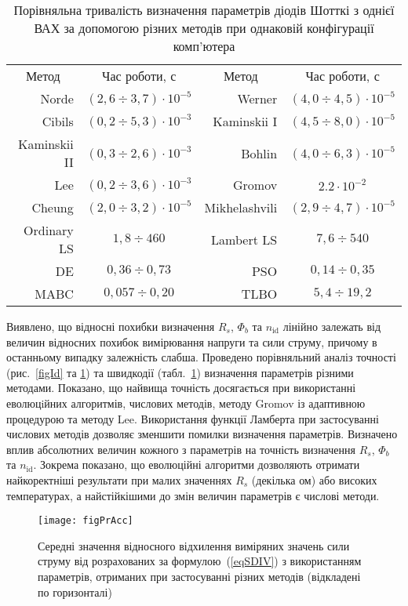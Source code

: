 \begin{table}
\caption{\label{tabRT}Порівняльна тривалість визначення параметрів діодів Шотткі з однієї ВАХ за допомогою різних методів при однаковій конфігурації комп'ютера}
\centering
\begin{tabular}{|r|c|r|c|}
\hline
\multicolumn{1}{|c|}{Метод}&Час роботи, с &\multicolumn{1}{c|}{Метод}&Час роботи, с\\ \hhline{|====|}
Norde &$(2,6\div3,7)\cdot10^{-5}$& Werner  &$(4,0\div4,5)\cdot10^{-5}$\\ \hline
Cibils  &$(0,2\div5,3)\cdot10^{-3}$& Kaminskii I &$(4,5\div8,0)\cdot10^{-5}$\\ \hline
Kaminskii II &$(0,3\div2,6)\cdot10^{-3}$& Bohlin &$(4,0\div6,3)\cdot10^{-5}$\\ \hline
Lee &$(0,2\div3,6)\cdot10^{-3}$& Gromov &$2.2\cdot10^{-2}$\\ \hline
Cheung &$(2,0\div3,2)\cdot10^{-5}$&Mikhelashvili &$(2,9\div4,7)\cdot10^{-5}$\\ \hline
Ordinary LS &$1,8\div460$&Lambert LS &$7,6\div540$\\ \hline
DE &$0,36\div0,73$&PSO &$0,14\div0,35$\\ \hline
MABC &$0,057\div0,20$&TLBO &$5,4\div19,2$ \\
\hline
\end{tabular}
\end{table}

Виявлено, що
відносні похибки визначення $R_s$, $\Phi_b$ та $n_\mathrm{id}$ лінійно залежать від величин відносних
похибок вимірювання напруги та сили струму, причому в останньому випадку залежність слабша.
Проведено порівняльний аналіз точності (рис.~\ref{figId} та \ref{figPrAcc}) та швидкодії (табл.~\ref{tabRT}) визначення
параметрів різними методами.
Показано, що найвища точність досягається при використанні еволюцiйних алгоритмів, числових методів,
методу Gromov із адаптивною процедурою та методу Lee.
Використання функції Ламберта при застосуванні числових методів дозволяє зменшити помилки визначення параметрів.
Визначено вплив абсолютних величин кожного з параметрів на точність визначення $R_s$, $\Phi_b$ та $n_\mathrm{id}$.
Зокрема показано, що еволюційні алгоритми дозволяють отримати найкоректніші результати при малих
значеннях $R_s$ (декілька ом) або високих температурах, а найстійкішими до змін величин параметрів є числові методи.
\begin{figure}[b]
\center
\texttt{[image: figPrAcc]}%
\caption{\label{figPrAcc}
Середні значення відносного відхилення виміряних значень сили струму
від розрахованих за формулою~(\ref{eqSDIV}) з використанням параметрів, отриманих при застосуванні різних методів (відкладені по горизонталі)
}
\end{figure}






